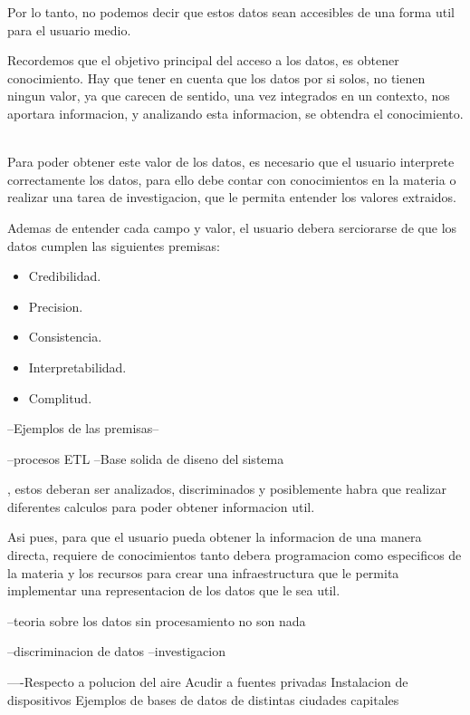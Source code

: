 Por lo tanto, no podemos decir que estos datos sean accesibles de una forma util para el usuario medio. 


Recordemos que el objetivo principal del acceso a los datos, es obtener conocimiento. Hay que tener en cuenta 
que los datos por si solos, no tienen ningun valor, ya que carecen de sentido, una vez integrados en un contexto,
nos aportara informacion, y analizando esta informacion, se obtendra el conocimiento.\\


\\
Para poder obtener este valor de los datos, es necesario que el usuario interprete correctamente los datos, para
ello debe contar con conocimientos en la materia o realizar una tarea de investigacion, que le permita entender
los valores extraidos.

Ademas de entender cada campo y valor, el usuario debera serciorarse de que los datos cumplen las siguientes premisas:
\begin{itemize}
    \item Credibilidad. 
    \item Precision. 
    \item Consistencia.
    \item Interpretabilidad.
    \item Complitud.
\end{itemize}
--Ejemplos de las premisas--

--procesos ETL
--Base solida de diseno del sistema

, estos deberan ser analizados, 
discriminados y posiblemente habra que realizar diferentes calculos para poder obtener informacion util.

Asi pues, para que el usuario pueda obtener la informacion de una manera directa, requiere de conocimientos tanto debera
programacion como especificos de la materia y los recursos para crear una infraestructura que le permita implementar 
una representacion de los datos que le sea util.

--teoria sobre los datos sin procesamiento no son nada

--discriminacion de datos
--investigacion




----Respecto a polucion del aire 
Acudir a fuentes privadas
Instalacion de dispositivos
Ejemplos de bases de datos de distintas ciudades capitales
